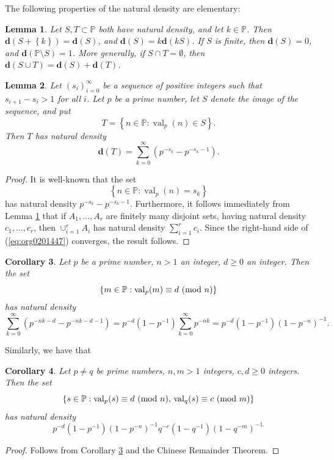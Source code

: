 \documentclass[12pt]{article}
\theoremstyle{definition}
\theoremstyle{remark}
\theoremstyle{plain}
\newtheorem{lemma}{Lemma}
\newtheorem{corollary}[lemma]{Corollary}
\newcommand{\modd}[2]{#1\ \textup{(mod }#2\textup{)}}
\newcommand{\set}[1]{\left\{{#1}\right\}}
\newcommand\setsuchas[2]{\left\{{#1}:{#2}\right\}}
\newcommand{\NNp}{{\mathbb{P}}}
\newcommand{\val}{\operatorname{val}}
\newcommand{\dens}{\mathbf{d}}
\begin{document}
The following  properties of the natural density are elementary:
\begin{lemma}
Let \(S,T \subset \NNp\) both have natural density, and let \(k \in \NNp\).
Then  \(\dens(S + \set{k}) = \dens(S)\), and 
\(\dens(S) = k\dens(kS)\). If \(S\) is finite, then \(\dens(S)=0\), and
\(\dens(\NNp \setminus S)=1\). More generally, if \(S \cap T = \emptyset\), then \(\dens(S \cup T) =\dens(S) + \dens(T)\).
\label{org560ea21}
\end{lemma}

\begin{lemma}
Let \((s_{i})_{i=0}^{\infty}\) be a sequence of positive integers such that \(s_{i+1} -s_{i} > 1\) for all \(i\).
Let \(p\) be a prime number, let \(S\) denote the image of the sequence, and put
\[
T = \setsuchas{n \in \NNp}{\val_{p}(n) \in S}.
\]
Then \(T\) has natural density
\begin{equation}
\label{eq:org0201447}
\dens(T) = \sum_{k=0}^{\infty}(p^{-s_{k}} - p^{-s_{k}-1}).
\end{equation}
\label{org5fa90b4}
\end{lemma}
\begin{proof}
It is well-known \cite{Conroy:Density} that the set
\[\setsuchas{n \in \NNp}{\val_{p}(n) = s_{k}}\]
has natural density
\(p^{-s_{k}} - p^{-s_{k}-1}.\)
Furthermore, it follows immediately from Lemma \ref{org560ea21} that if
\(A_{1},\dots,A_{r}\) are finitely many disjoint sets, having natural density \(c_{1},\dots,c_{r}\),
then \(\cup_{i=1}^{r} A_{i}\) has natural density \(\sum_{{i=1}}^{r}c_{i}\).
Since the right-hand side of (\ref{eq:org0201447}) converges, the result follows.
\end{proof}

\begin{corollary}
Let \(p\) be a prime number, \(n>1\)  an integer, \(d \ge 0\) an integer.
Then the set
\[
\setsuchas{m \in \NNp}{\val_p(m) \equiv \modd{d}{n}}
\]
has natural density
\[
  \sum_{k=0}^{\infty} (p^{-nk -d} - p^{-nk -d -1}) =
  p^{-d}(1-p^{-1})\sum_{k=0}^{\infty} p^{-nk} =
  p^{-d}(1-p^{-1}) (1-p^{-n})^{-1}.
\]
\label{orgefa6660}
\end{corollary}

Similarly, we have that
\begin{corollary}
Let \(p \neq q\) be  prime numbers, \(n,m>1\)  integers, \(c,d \ge 0\) integers.
Then the set
\[
\setsuchas{s \in \NNp}{\val_p(s) \equiv \modd{d}{n}, \, \val_q(s) \equiv \modd{c}{m}}
\]
has natural density
\[
  p^{-d}(1-p^{-1}) (1-p^{-n})^{-1}    q^{-c}(1-q^{-1}) (1-q^{-m})^{-1.}
\]
\label{orgf3d0d82}
\end{corollary}
\begin{proof}
Follows from Corollary \ref{orgefa6660} and the Chinese Remainder Theorem.
\end{proof}
\end{document}
